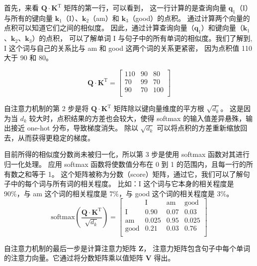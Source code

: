 首先，来看 $\boldsymbol{Q} \cdot \boldsymbol{K}^\mathrm{T}$ 矩阵的第一行，可以看到，
这一行计算的是查询向量 $\boldsymbol{q}_1$（I）与所有的键向量 $\boldsymbol{k}_1$（I）、$\boldsymbol{k}_2$（am）和 $\boldsymbol{k}_3$（good）的点积。
通过计算两个向量的点积可以知道它们之间的相似度。
因此，通过计算查询向量（$\boldsymbol{q}_1$）和键向量（$\boldsymbol{k}_1$、$\boldsymbol{k}_2$、$\boldsymbol{k}_3$）的点积，
可以了解单词 I 与句子中的所有单词的相似度。我们了解到, I 这个词与自己的关系比与 am 和 good 这两个词的关系更紧密，
因为点积值 110 大于 90 和 80。

\begin{table}[ht]
	\centering
	$$
		\boldsymbol{Q} \cdot \boldsymbol{K}^\mathrm{T} =
		\begin{bmatrix}
			110 & 90 & 80  \\
			70  & 99 & 70  \\
			90  & 70 & 100 \\
		\end{bmatrix}
	$$
	\caption{点积示例，本节的结果均为假设值，后续不再说明}
\end{table}

自注意力机制的第 2 步是将 $\boldsymbol{Q} \cdot \boldsymbol{K}^\mathrm{T}$ 矩阵除以键向量维度的平方根 $\sqrt{d_k}$。
这是因为当 $d_k$ 较大时，点积结果的方差也会较大，使得 softmax 的输入值差异悬殊，输出接近 one-hot 分布，导致梯度消失。
除以 $\sqrt{d_k}$ 可以将点积的方差重新缩放回去，从而获得更稳定的梯度。

目前所得的相似度分数尚未被归一化，所以第 3 步是使用 softmax 函数对其进行归一化处理。
应用 softmax 函数将使数值分布在 0 到 1 的范围内，且每一行的所有数之和等于 1。
这个矩阵被称为分数（score）矩阵，通过它，我们可以了解句子中的每个词与所有词的相关程度。
比如：I 这个词与它本身的相关程度是 90\%，与 am 这个词的相关程度是 7\%，与 good 这个词的相关程度是 3\%。
$$
	\text{softmax}\left(\frac{\boldsymbol{Q} \cdot \boldsymbol{K}^\mathrm{T}}{\sqrt{d_k}}\right) =
	\begin{bmatrix}
		            & \text{I} & \text{am} & \text{good} \\
		\text{I}    & 0.90     & 0.07      & 0.03        \\
		\text{am}   & 0.025    & 0.95      & 0.025       \\
		\text{good} & 0.21     & 0.03      & 0.76        \\
	\end{bmatrix}
$$

自注意力机制的最后一步是计算注意力矩阵 $\boldsymbol{Z}$，
注意力矩阵包含句子中每个单词的注意力向量。它通过将分数矩阵乘以值矩阵 $\boldsymbol{V}$ 得出。

